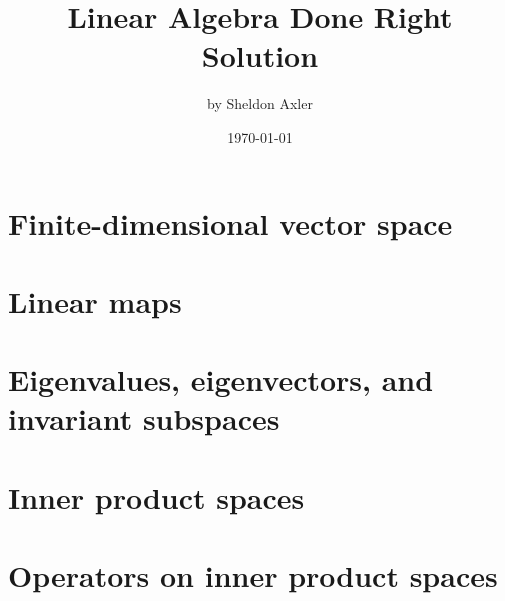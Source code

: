 \documentclass[11pt]{elegantbook}
\title{Linear Algebra Done Right Solution}
\subtitle{by Sheldon Axler}
\date{\today}
\begin{document}
\maketitle

\frontmatter
\tableofcontents

\mainmatter

\setcounter{chapter}{1}
\chapter{Finite-dimensional vector space}


\chapter{Linear maps}


\setcounter{chapter}{4}

\chapter{Eigenvalues, eigenvectors, and invariant subspaces}


\chapter{Inner product spaces}


\chapter{Operators on inner product spaces}

\end{document}

